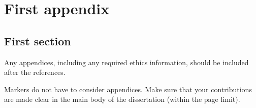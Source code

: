 \documentclass[logo,bsc,singlespacing,parskip,online]{infthesis}
\begin{document}
\chapter{First appendix}

\section{First section}

Any appendices, including any required ethics information, should be included
after the references.

Markers do not have to consider appendices. Make sure that your contributions
are made clear in the main body of the dissertation (within the page limit).
\end{document}
